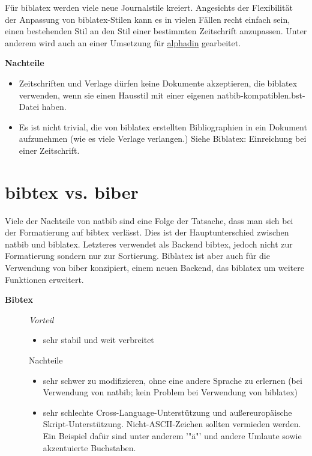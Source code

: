 Für biblatex werden viele neue Journalstile kreiert. Angesichts der Flexibilität der Anpassung von biblatex-Stilen kann es in vielen Fällen recht einfach sein, einen bestehenden Stil an den Stil einer bestimmten Zeitschrift anzupassen. Unter anderem wird auch an einer Umsetzung für \href{https://tex.stackexchange.com/questions/124473/is-there-a-biblatex-equivalent-for-the-bibtex-style-alphadin-for-the-din-1505}{alphadin} gearbeitet.
\newline

\textbf{Nachteile}

\begin{itemize}
	\item Zeitschriften und Verlage dürfen keine Dokumente akzeptieren, die biblatex verwenden, wenn sie einen Hausstil mit einer eigenen natbib-kompatiblen.bst-Datei haben.
	\item Es ist nicht trivial, die von biblatex erstellten Bibliographien in ein Dokument aufzunehmen (wie es viele Verlage verlangen.) Siehe Biblatex: Einreichung bei einer Zeitschrift.	
\end{itemize}

\section{bibtex vs. biber}
Viele der Nachteile von natbib sind eine Folge der Tatsache, dass man sich bei der Formatierung auf bibtex verlässt. Dies ist der Hauptunterschied zwischen natbib und biblatex. Letzteres verwendet als Backend bibtex, jedoch nicht zur Formatierung sondern nur zur Sortierung. Biblatex ist aber auch für die Verwendung von biber konzipiert, einem neuen Backend, das biblatex um weitere Funktionen erweitert.
\bigskip

\textbf{Bibtex}

\begin{description}
	\item[] \emph{Vorteil}
	\begin{itemize}
		\item sehr stabil und weit verbreitet
	\end{itemize}
	\item[] Nachteile
	\begin{itemize}
		\item sehr schwer zu modifizieren, ohne eine andere Sprache zu erlernen (bei Verwendung von natbib; kein Problem bei Verwendung von biblatex)
		\item sehr schlechte Cross-Language-Unterstützung und außereuropäische Skript-Unterstützung. Nicht-ASCII-Zeichen sollten vermieden werden. Ein Beispiel dafür sind unter anderem '"ä"' und andere Umlaute sowie akzentuierte Buchstaben. 
	\end{itemize}
\end{description}

